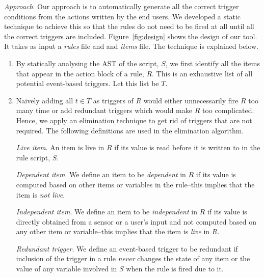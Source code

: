 \documentclass{sig-alternate-05-2015}
\begin{document}
\emph{Approach}. Our approach is to automatically generate all the correct trigger conditions from the actions written by the end users. We developed a static technique to achieve this so that the rules do not need to be fired at all until all the correct triggers are included. Figure~\ref{fig:design} shows the design of our tool. It takes as input a \textit{rules} file and and \textit{items} file. The technique is explained below.
\begin{enumerate}
\item By statically analysing the AST of the script, $S$, we first identify all the items that appear in the action block of a rule, $R$. This is an exhaustive list of all potential event-based triggers. Let this list be $T$.
\item Naively adding all $t \in T$ as triggers of $R$ would either unnecessarily fire $R$ too many time or add redundant triggers which would make $R$ too complicated. Hence, we apply an elimination technique to get rid of triggers that are not required. The following definitions are used in the elimination algorithm. 

\emph{Live item}. An item is live in $R$ if its value is read before it is written to in the rule script, $S$. 

\emph{Dependent item}. We define an item to be \emph{dependent} in $R$ if its value is computed based on other items or variables in the rule--this implies that the item is \emph{not live}. 
 
\emph{Independent item}. We define an item to be \emph{independent} in $R$ if  its value is directly obtained from a sensor or a user's input and not computed based on any other item or variable--this implies that the item is \emph{live} in $R$. 

\emph{Redundant trigger}. We define an event-based trigger to be redundant if inclusion of the trigger in a rule \emph{never} changes the state of any item or the value of any variable involved in $S$ when the rule is fired due to it.


\end{enumerate}
\end{document}
